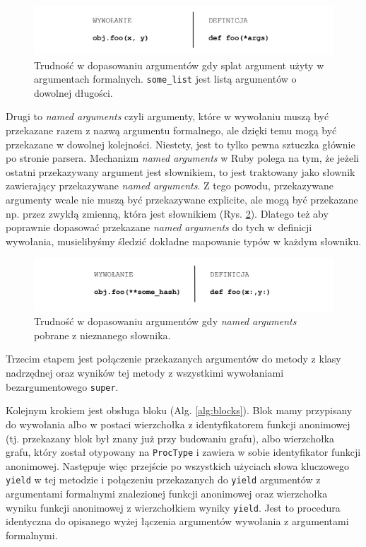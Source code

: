 \documentclass[shortabstract,mgr]{iithesis}
\begin{document}
\begin{figure}[htb]
	\centering
	\includegraphics[scale=0.6]{imgs/formal-splat.png}
	\caption{Trudność w dopasowaniu argumentów gdy splat argument użyty w argumentach formalnych. 	\texttt{some\_list} jest listą argumentów o dowolnej długości.}
	\label{fig:formal-splat}
\end{figure}

Drugi to \textit{named arguments} czyli argumenty, które w wywołaniu muszą być przekazane razem z nazwą argumentu formalnego, ale dzięki temu mogą być przekazane w dowolnej kolejności. Niestety, jest to tylko pewna sztuczka głównie po stronie parsera. Mechanizm \textit{named arguments} w Ruby polega na tym, że jeżeli ostatni przekazywany argument jest słownikiem, to jest traktowany jako słownik zawierający przekazywane \textit{named arguments}. Z tego powodu, przekazywane argumenty wcale nie muszą być przekazywane explicite, ale mogą być przekazane np. przez zwykłą zmienną, która jest słownikiem (Rys. \ref{fig:named-args}). Dlatego też aby poprawnie dopasować przekazane \textit{named arguments} do tych w definicji wywołania, musielibyśmy śledzić dokładne mapowanie typów w każdym słowniku.

\begin{figure}[htb]
	\centering
	\includegraphics[scale=0.6]{imgs/named-args.png}
	\caption{Trudność w dopasowaniu argumentów gdy \emph{named arguments} pobrane z nieznanego słownika.}
	\label{fig:named-args}
\end{figure}

Trzecim etapem jest połączenie przekazanych argumentów do metody z klasy nadrzędnej oraz wyników tej metody z wszystkimi wywołaniami bezargumentowego \texttt{super}.

Kolejnym krokiem jest obsługa bloku (Alg. \ref{alg:blocks}). Blok mamy przypisany do wywołania albo w postaci wierzchołka z identyfikatorem funkcji anonimowej (tj. przekazany blok był znany już przy budowaniu grafu), albo wierzchołka grafu, który został otypowany na \texttt{ProcType} i zawiera w sobie identyfikator funkcji anonimowej. Następuje więc przejście po wszystkich użyciach słowa kluczowego \texttt{yield} w tej metodzie i połączeniu przekazanych do \texttt{yield} argumentów z argumentami formalnymi znalezionej funkcji anonimowej oraz wierzchołka wyniku funkcji anonimowej z wierzchołkiem wyniky \texttt{yield}. Jest to procedura identyczna do opisanego wyżej łączenia argumentów wywołania z argumentami formalnymi.
\end{document}
